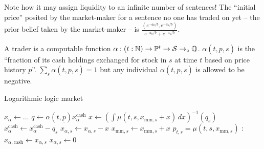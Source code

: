 \documentclass{article}
\begin{document}
Note how it may assign liquidity to an infinite number of sentences! The ``initial price'' posited by the market-maker for a sentence no one has traded on yet -- the prior belief taken by the market-maker -- is $\frac{(e^{-a_0/b},e^{-a_1/b})}{e^{-a_0/b}+e^{-a_1/b}}$.

\begin{definition}\label{def:trader}
    A trader is a computable function $\alpha:(t:\mathbb{N})\to\mathbb{P}^t\to\mathcal{S}\to_\circ\mathbb{Q}$. $\alpha(t,\underline{p},s)$ is the ``fraction of its cash holdings exchanged for stock in $s$ at time $t$ based on price history $\underline{p}$''. $\sum_s\alpha(t,\underline{p},s)=1$ but any individual $\alpha(t,\underline{p},s)$ is allowed to be negative.
\end{definition}

\begin{algorithm}\label{alg:li}
    \caption{Logarithmic logic market}
    \begin{algorithmic}[1]
        \For{$\alpha$}
            \State $x_\alpha \gets \dots$ 
        \EndFor
            \For{$\alpha$}
                \State $q\gets\alpha(t,\underline{p})x_\alpha^{\mathrm{cash}}$ 
                    \State $x\gets (\int\mu(t,s,x_{\mathrm{mm},s}+x)\,dx)^{-1}(q_s)$ 
                    \State $x_{\alpha}^{\mathrm{cash}} \gets x_{\alpha}^{\mathrm{cash}} - q_s$ 
                    \State $x_{\alpha,s} \gets x_{\alpha,s} - x$
                    \State $x_{\mathrm{mm},s}\gets x_{\mathrm{mm},s} + x$
                    \State $p_{t,s}=\mu(t,s, x_{\mathrm{mm},s})$ 
                \EndFor
            \EndFor
                \For{$\alpha$}:
                    \State $x_{\alpha, \mathrm{cash}} \gets x_{\alpha, s}$ 
                    \State $x_{\alpha, s} \gets 0$
                \EndFor
            \EndFor
        \EndWhile
    \end{algorithmic}
\end{algorithm}


\printbibliography
\end{document}
